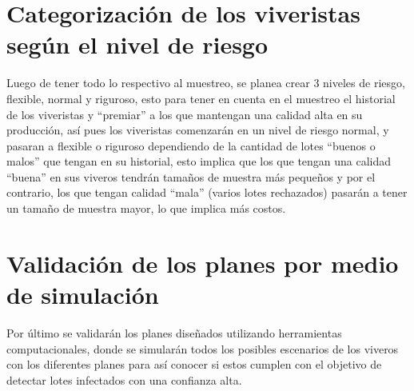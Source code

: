 \section{Categorizaci\'{o}n de los viveristas seg\'{u}n el nivel de riesgo} 

Luego de tener todo lo respectivo al muestreo, se planea crear 3 niveles de riesgo, flexible, normal y riguroso, esto para tener en cuenta en el muestreo el historial de los viveristas y ``premiar'' a los que mantengan una calidad alta en su producci\'{o}n, as\'{i} pues los viveristas comenzar\'{a}n en un nivel de riesgo normal, y pasaran a flexible o riguroso dependiendo de la cantidad de lotes ``buenos o malos'' que tengan en su historial, esto implica que los que tengan una calidad ``buena'' en sus viveros tendr\'{a}n tama\~{n}os de muestra m\'{a}s peque\~{n}os y por el contrario, los que tengan calidad ``mala'' (varios lotes rechazados) pasar\'{a}n a tener un  tama\~{n}o de muestra mayor, lo que implica m\'{a}s costos.

\section{Validaci\'{o}n de los planes por medio de simulaci\'{o}n}

Por \'{u}ltimo se validar\'{a}n los planes dise\~{n}ados utilizando herramientas computacionales, donde se simular\'{a}n todos los posibles escenarios de los viveros con los diferentes planes para as\'{i} conocer si estos cumplen con el objetivo de detectar lotes infectados con una confianza alta.


